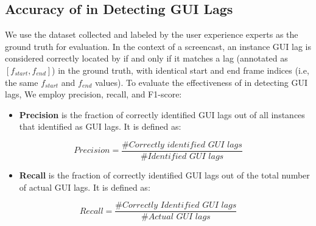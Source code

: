 \subsection{Accuracy of \tool in Detecting GUI Lags}



We use the dataset collected and labeled by the user experience experts as the ground truth for evaluation. 
In the context of a screencast, an instance GUI lag is considered correctly located by \tool if and only if it matches a lag (annotated as $[f_{start}, f_{end}]$) in the ground truth, with identical start and end frame indices (i.e, the same $f_{start}$ and $f_{end}$ values). 
To evaluate the effectiveness of \tool in detecting GUI lags, We employ precision, recall, and F1-score:

\begin{itemize}
    \item \textbf{Precision} is the fraction of correctly identified GUI lags out of all instances that \tool identified as GUI lags. It is defined as: 
\end{itemize}
\begin{equation}
Precision = \frac{\#\textit{Correctly identified GUI lags}}{\#\textit{Identified GUI lags}}
\end{equation}

\begin{itemize}
    \item \textbf{Recall} is the fraction of correctly identified GUI lags out of the total number of actual GUI lags. It is defined as: 
\end{itemize}
\begin{equation}
Recall = \frac{\#\textit{Correctly Identified GUI lags}}{\#\textit{Actual GUI lags}}
\end{equation}

